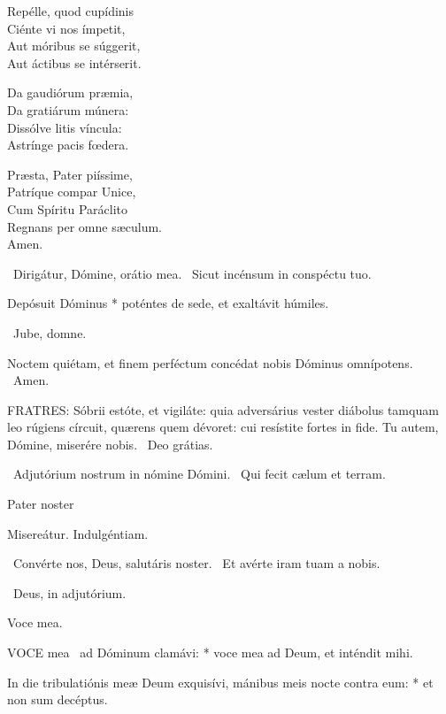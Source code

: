Repélle, quod cupídinis\\
Ciénte vi nos ímpetit,\\
Aut móribus se súggerit,\\
Aut áctibus se intérserit.

Da gaudiórum præmia,\\
Da gratiárum múnera:\\
Dissólve litis víncula:\\
Astrínge pacis fœdera.

Præsta, Pater piíssime,\\
Patríque compar Unice,\\
Cum Spíritu Paráclito\\
Regnans per omne sæculum.\\
Amen.

\V\ Dirigátur, Dómine, orátio mea. \R\ Sicut incénsum in conspéctu tuo.

 Depósuit Dóminus * poténtes de sede, et exaltávit húmiles.



\V\ Jube, domne.

 Noctem quiétam, et finem perféctum concédat nobis Dóminus omnípotens. \R\ Amen.


\lettrine[lines=2]{F}{RATRES}: Sóbrii estóte, et vigiláte: quia adversárius vester diábolus tamquam leo rúgiens círcuit, quærens quem dévoret: cui resístite fortes in fide. Tu autem, Dómine, miserére nobis. \R\ Deo grátias.

\V\ Adjutórium nostrum in nómine Dómini. \R\ Qui fecit cælum et terram.

Pater noster 

 Misereátur. Indulgéntiam.

\V\ Convérte nos, Deus, salutáris noster. \R\ Et avérte iram tuam a nobis.

\V\ Deus, in adjutórium.

 Voce mea. \textdagger


\lettrine[lines=2]{V}{OCE} mea \textdagger\ ad Dóminum clamávi: * voce mea ad Deum, et inténdit mihi.

In die tribulatiónis meæ Deum exquisívi, mánibus meis nocte contra eum: * et non sum decéptus.

